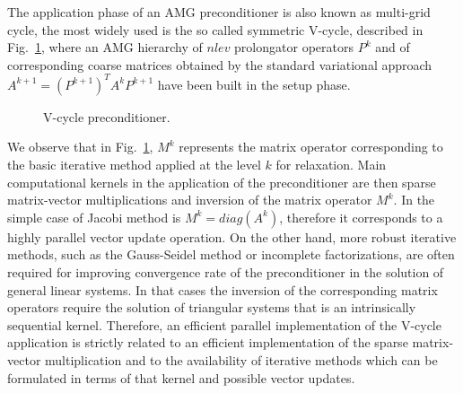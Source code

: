 The application phase of an AMG preconditioner is also known as
multi-grid cycle, the most widely used is the so called symmetric
V-cycle, described in Fig.~\ref{Vcycle}, where an AMG hierarchy of
$nlev$ prolongator operators $P^k$ and of corresponding coarse
matrices obtained by the standard variational approach
$A^{k+1}=(P^{k+1})^TA^kP^{k+1}$ have been built in the setup
phase. 
\begin{figure}[t]
\begin{center}
\caption{V-cycle preconditioner.\label{Vcycle}}
\end{center}
\end{figure}

We observe that in Fig.~\ref{Vcycle}, $M^k$ represents the matrix
operator corresponding to the basic iterative method applied at the
level $k$ for relaxation. 
Main computational kernels in the application of the preconditioner
are then sparse matrix-vector multiplications and inversion of the
matrix operator $M^k$. In the simple case of Jacobi method is
$M^k=diag(A^k)$, therefore it corresponds to a highly parallel vector
update operation. On the other hand, more robust iterative methods,
such as the Gauss-Seidel method or incomplete factorizations, are
often required for improving convergence rate of the preconditioner in
the solution of general linear systems. In that cases the inversion of
the corresponding matrix operators require the solution of triangular
systems that is an intrinsically sequential kernel. Therefore, an
efficient parallel implementation of the V-cycle application is
strictly related to an efficient implementation of the sparse
matrix-vector multiplication and to the availability of iterative
methods which can be formulated in terms of that kernel and possible
vector updates. 
